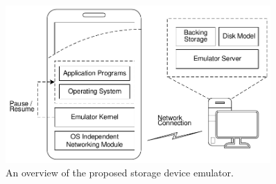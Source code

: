 \begin{figure}[tb]
	\centering
	\includegraphics[width=0.9\textwidth]{figures/ch6-emulator-overview.pdf}
	\caption{\label{fig:ch6-emulator-overview}An overview of the proposed storage device emulator.}
\end{figure}

